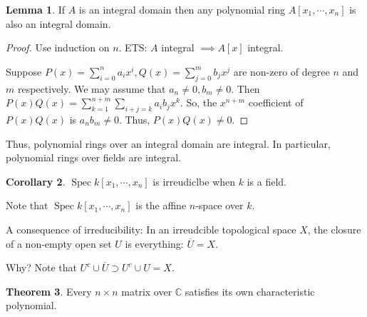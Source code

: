 \documentclass{article}
\theoremstyle{definition}
\newtheorem{theorem}{Theorem}
\newtheorem{lemma}[theorem]{Lemma}
\newtheorem{corollary}[theorem]{Corollary}
\begin{document}
    \begin{lemma}
        If \(A\) is an integral domain then any polynomial ring \(A[x_1, \cdots , x_n]\) is also an integral domain.
    \end{lemma}

    \begin{proof}
        Use induction on \(n\). ETS: \(A\) integral \(\implies A[x]\) integral.

        Suppose \(P(x) = \sum_{i=0}^n a_i x^i, Q(x) = \sum_{j=0}^m b_j x^j\) are non-zero of degree \(n\) and \(m\) respectively. We may assume that \(a_n \neq 0, b_m\neq 0\). Then \(P(x) Q(x) = \sum_{k=1}^{n+m} \sum_{i+j=k} a_i b_j x^k \). So, the \(x^{n+m}\) coefficient of \(P(x)Q(x)\) is \(a_n b_m \neq 0\). Thus, \(P(x)Q(x) \neq 0\). 
    \end{proof}

    Thus, polynomial rings over an integral domain are integral. In particular, polynomial rings over fields are integral.

    \begin{corollary}
        \(\operatorname{Spec} k[x_1, \cdots , x_n]\) is irreudiclbe when \(k\) is a field.
    \end{corollary}

    Note that \(\operatorname{Spec} k[x_1, \cdots , x_n]\) is the affine \(n\)-space over \(k\).

    A consequence of irreducibility: In an irreudcible topological space \(X\), the closure of a non-empty open set \(U\) is everything: \(\overline{U} = X\).

    Why? Note that \(U^c \cup \overline{U} \supset U^c \cup U = X\). 

    \begin{theorem}
        Every \(n \times n\) matrix over \(\mathbb{C}\) satisfies its own characteristic polynomial.
    \end{theorem}
\end{document}
